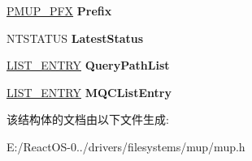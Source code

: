 \begin{DoxyCompactItemize}
\hyperlink{struct___m_u_p___p_f_x}{P\+M\+U\+P\+\_\+\+P\+FX} {\bfseries Prefix}
\item 
\mbox{\label{struct___m_u_p___m_q_c_a57e31ffc0bcd7c814cb88500eb4c39b1}} 
N\+T\+S\+T\+A\+T\+US {\bfseries Latest\+Status}
\item 
\mbox{\label{struct___m_u_p___m_q_c_a7c0f01752d28de6f0e232117a3d0000e}} 
\hyperlink{struct___l_i_s_t___e_n_t_r_y}{L\+I\+S\+T\+\_\+\+E\+N\+T\+RY} {\bfseries Query\+Path\+List}
\item 
\mbox{\label{struct___m_u_p___m_q_c_a791aeea323cb218ec07721e4a4b77d78}} 
\hyperlink{struct___l_i_s_t___e_n_t_r_y}{L\+I\+S\+T\+\_\+\+E\+N\+T\+RY} {\bfseries M\+Q\+C\+List\+Entry}
\end{DoxyCompactItemize}


该结构体的文档由以下文件生成\+:\begin{DoxyCompactItemize}
\item 
E\+:/\+React\+O\+S-\/0../drivers/filesystems/mup/mup.\+h\end{DoxyCompactItemize}
